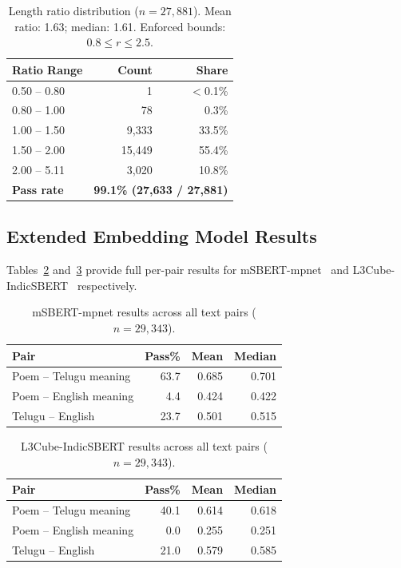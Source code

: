 \documentclass[11pt]{article}
\begin{document}
\begin{table}[H]
\centering
\small
\caption{Length ratio distribution ($n = 27{,}881$). Mean ratio: 1.63;
median: 1.61. Enforced bounds: $0.8 \leq r \leq 2.5$.}
\label{tab:lengthratio}
\begin{tabular}{lrr}
\toprule
\textbf{Ratio Range} & \textbf{Count} & \textbf{Share} \\
\midrule
0.50 -- 0.80 &      1 & $<$0.1\% \\
0.80 -- 1.00 &     78 &    0.3\% \\
1.00 -- 1.50 &  9,333 &   33.5\% \\
1.50 -- 2.00 & 15,449 &   55.4\% \\
2.00 -- 5.11 &  3,020 &   10.8\% \\
\midrule
\textbf{Pass rate} & \multicolumn{2}{r}{\textbf{99.1\% (27,633 / 27,881)}} \\
\bottomrule
\end{tabular}
\end{table}

\subsection{Extended Embedding Model Results}

Tables~\ref{tab:msbert} and~\ref{tab:l3cube} provide full per-pair results
for mSBERT-mpnet~\citep{reimers2020multilingual} and
L3Cube-IndicSBERT~\citep{deode2023l3cubeindicsbertsimpleapproachlearning} respectively.

\begin{table}[H]
\centering
\small
\caption{mSBERT-mpnet results across all text pairs ($n = 29{,}343$).}
\label{tab:msbert}
\begin{tabular}{lrrr}
\toprule
\textbf{Pair} & \textbf{Pass\%} & \textbf{Mean} & \textbf{Median} \\
\midrule
Poem -- Telugu meaning  & 63.7 & 0.685 & 0.701 \\
Poem -- English meaning &  4.4 & 0.424 & 0.422 \\
Telugu -- English       & 23.7 & 0.501 & 0.515 \\
\bottomrule
\end{tabular}
\end{table}

\begin{table}[H]
\centering
\small
\caption{L3Cube-IndicSBERT results across all text pairs ($n = 29{,}343$).}
\label{tab:l3cube}
\begin{tabular}{lrrr}
\toprule
\textbf{Pair} & \textbf{Pass\%} & \textbf{Mean} & \textbf{Median} \\
\midrule
Poem -- Telugu meaning  & 40.1 & 0.614 & 0.618 \\
Poem -- English meaning &  0.0 & 0.255 & 0.251 \\
Telugu -- English       & 21.0 & 0.579 & 0.585 \\
\bottomrule
\end{tabular}
\end{table}
\end{document}
